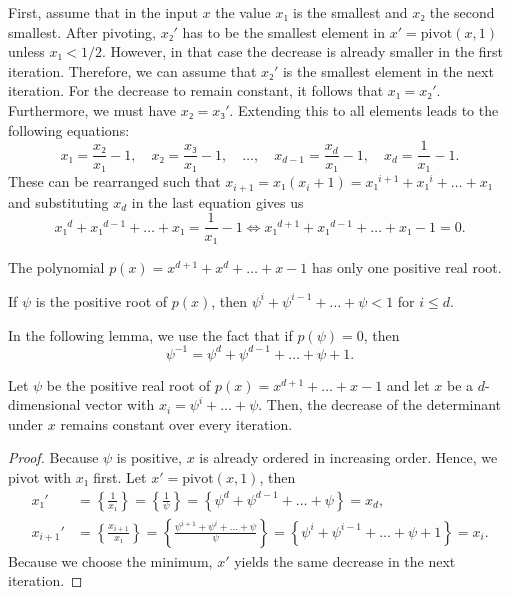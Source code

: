 First, assume that in the input $x$ the value $x₁$ is the smallest and $x₂$ the second smallest.
After pivoting, $x₂'$ has to be the smallest element in $x' = \mathrm{pivot}(x, 1)$ unless $x₁ < 1/2$.
However, in that case the decrease is already smaller in the first iteration.
Therefore, we can assume that $x₂'$ is the smallest element in the next iteration.
For the decrease to remain constant, it follows that $x₁ = x₂'$.
Furthermore, we must have $x₂ = x₃'$.
Extending this to all elements leads to the following equations:
\[
  x₁ = \frac{x₂}{x₁} - 1,
  \quad x₂ = \frac{x₃}{x₁} - 1,
  \quad \dots,
  \quad x_{d-1} = \frac{x_d}{x₁} - 1,
  \quad x_d = \frac{1}{x₁} - 1.
\]
These can be rearranged such that $x_{i + 1} = x₁ (x_i + 1) = x₁^{i+1} + x₁^i + \dots + x₁$
and substituting $x_d$ in the last equation gives us
\[
  x₁^d + x₁^{d-1} + \dots + x₁ = \frac{1}{x₁} - 1
  \iff
  x₁^{d+1} + x₁^{d-1} + \dots + x₁ - 1 = 0.
\]

\begin{lemma}
  The polynomial $p(x) = x^{d+1} + x^d + \dots + x - 1$ has only one positive real root.
\end{lemma}

\begin{corollary}
  If $ψ$ is the positive root of $p(x)$, then $ψ^i + ψ^{i-1} + \dots + ψ < 1$ for $i ≤ d$.
\end{corollary}

In the following lemma, we use the fact that if $p(ψ) = 0$, then
\[
  ψ^{-1} = ψ^d + ψ^{d-1} + \dots + ψ + 1.
\]

\begin{lemma}
  Let $ψ$ be the positive real root of $p(x) = x^{d+1} + \dots + x - 1$
  and let $x$ be a $d$-dimensional vector with $x_i = ψ^i + \dots + ψ$.
  Then, the decrease of the determinant under $x$ remains constant over every iteration.
\end{lemma}

\begin{proof}
  Because $ψ$ is positive, $x$ is already ordered in increasing order.
  Hence, we pivot with $x₁$ first.
  Let $x' = \mathrm{pivot}(x, 1)$,
  then
  \begin{align*}
    x₁'
    & = \left\{\frac{1}{x₁}\right\}
    = \left\{\frac1{ψ}\right\}
    = \left\{ψ^d + ψ^{d-1} + \dots + ψ\right\} = x_d, \\
    x_{i+1}'
    & = \left\{\frac{x_{i+1}}{x₁}\right\}
    = \left\{\frac{ψ^{i+1} + ψ^i + \dots + ψ}{ψ}\right\}
    = \left\{ψ^i + ψ^{i-1} + \dots + ψ + 1\right\}
    = x_i.
  \end{align*}
  Because we choose the minimum, $x'$ yields the same decrease in the next iteration.
\end{proof}

